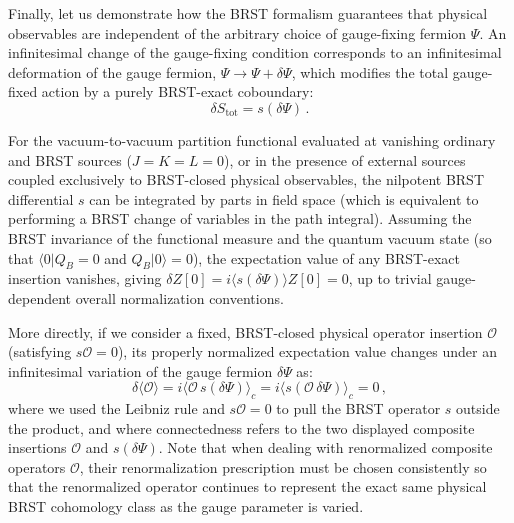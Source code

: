 Finally, let us demonstrate how the BRST formalism guarantees that physical observables are independent of the arbitrary choice of gauge-fixing fermion \(\Psi\). An infinitesimal change of the gauge-fixing condition corresponds to an infinitesimal deformation of the gauge fermion, \(\Psi \rightarrow \Psi + \delta\Psi\), which modifies the total gauge-fixed action by a purely BRST-exact coboundary:
\begin{equation} \label{eq:gauge_variation_action}
    \delta S_{\text{tot}} = s(\delta\Psi) \, .
\end{equation}

For the vacuum-to-vacuum partition functional evaluated at vanishing ordinary and BRST sources (\(J = K = L = 0\)), or in the presence of external sources coupled exclusively to BRST-closed physical observables, the nilpotent BRST differential \(s\) can be integrated by parts in field space (which is equivalent to performing a BRST change of variables in the path integral). Assuming the BRST invariance of the functional measure and the quantum vacuum state (so that \(\langle 0 | Q_B = 0\) and \(Q_B | 0 \rangle = 0\)), the expectation value of any BRST-exact insertion vanishes, giving \(\delta Z[0] = i \langle s(\delta\Psi) \rangle Z[0] = 0\), up to trivial gauge-dependent overall normalization conventions.

More directly, if we consider a fixed, BRST-closed physical operator insertion \(\mathcal{O}\) (satisfying \(s\mathcal{O} = 0\)), its properly normalized expectation value changes under an infinitesimal variation of the gauge fermion \(\delta\Psi\) as:
\begin{equation} \label{eq:gauge_independence_observable}
    \delta \langle \mathcal{O} \rangle = i \langle \mathcal{O} \, s(\delta\Psi) \rangle_c = i \langle s(\mathcal{O} \, \delta\Psi) \rangle_c = 0 \, ,
\end{equation}
where we used the Leibniz rule and \(s\mathcal{O} = 0\) to pull the BRST operator \(s\) outside the product, and where connectedness refers to the two displayed composite insertions \(\mathcal{O}\) and \(s(\delta\Psi)\). Note that when dealing with renormalized composite operators \(\mathcal{O}\), their renormalization prescription must be chosen consistently so that the renormalized operator continues to represent the exact same physical BRST cohomology class as the gauge parameter is varied.

